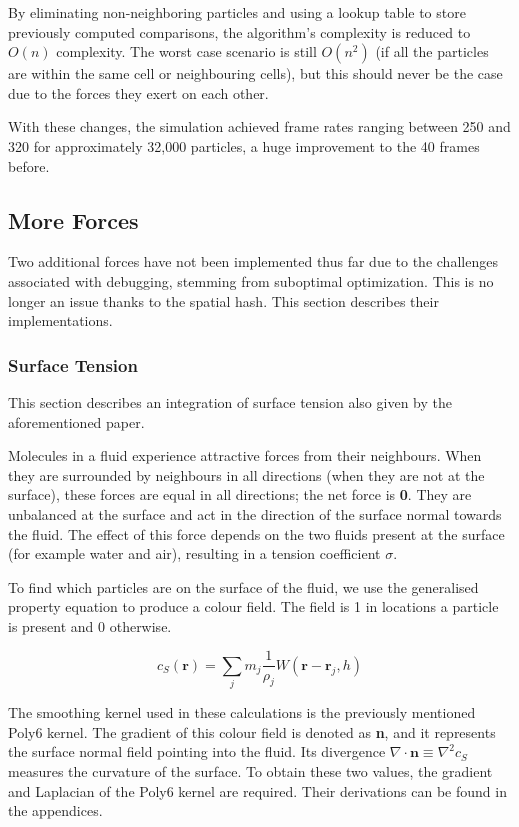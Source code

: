 \documentclass[12pt]{article}
\begin{document}
    By eliminating non-neighboring particles and using a lookup table to store previously computed comparisons, the algorithm's complexity is reduced to $O(n)$ complexity. The worst case scenario is still $O(n^2)$ (if all the particles are within the same cell or neighbouring cells), but this should never be the case due to the forces they exert on each other. 

    With these changes, the simulation achieved frame rates ranging between 250 and 320 for approximately 32,000 particles, a huge improvement to the 40 frames before.

    \subsection{More Forces}

    Two additional forces have not been implemented thus far due to the challenges associated with debugging, stemming from suboptimal optimization. This is no longer an issue thanks to the spatial hash. This section describes their implementations.

    \subsubsection{Surface Tension}

    This section describes an integration of surface tension also given by the aforementioned paper\cite{sca}.

    Molecules in a fluid experience attractive forces from their neighbours. When they are surrounded by neighbours in all directions (when they are not at the surface), these forces are equal in all directions; the net force is \textbf{0}. They are unbalanced at the surface and act in the direction of the surface normal towards the fluid. The effect of this force depends on the two fluids present at the surface (for example water and air), resulting in a tension coefficient $\sigma$.

    To find which particles are on the surface of the fluid, we use the generalised property equation to produce a colour field. The field is 1 in locations a particle is present and 0 otherwise.

    \begin{equation}
        c_S(\textbf{r}) = \sum_{j}{m_j \frac{1}{\rho_j}W(\textbf{r} - \textbf{r}_j, h)}
    \end{equation}

    The smoothing kernel used in these calculations is the previously mentioned Poly6 kernel. The gradient of this colour field is denoted as \textbf{n}, and it represents the surface normal field pointing into the fluid. Its divergence $\nabla \cdot \textbf{n} \equiv \nabla^2 c_S$ measures the curvature of the surface. To obtain these two values, the gradient and Laplacian of the Poly6 kernel are required. Their derivations can be found in the appendices.
\end{document}
